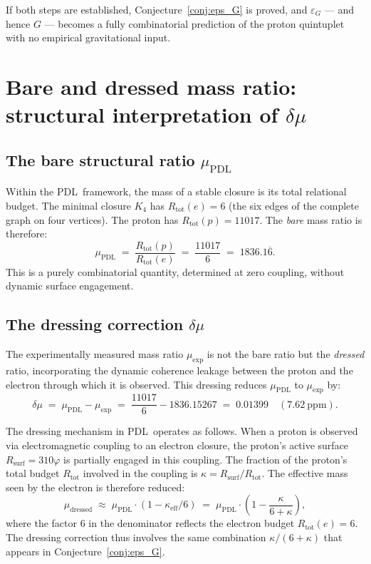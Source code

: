 \documentclass[11pt,a4paper]{article}
\theoremstyle{definition}
\newcommand{\PDL}{\textnormal{PDL}}
\newcommand{\Rsurf}{R_{\mathrm{surf}}}
\newcommand{\Rtot}{R_{\mathrm{tot}}}
\newcommand{\epsg}{\varepsilon_G}
\newcommand{\Kfour}{K_4}
\newcommand{\vp}{\varphi}
\newcommand{\kap}{\kappa}
\newcommand{\muPDL}{\mu_{\mathrm{PDL}}}
\newcommand{\muexp}{\mu_{\mathrm{exp}}}
\begin{document}
If both steps are established, Conjecture~\ref{conj:eps_G} is proved, and $\epsg$ --- and hence $G$ --- becomes a fully combinatorial prediction of the proton quintuplet with no empirical gravitational input.

\section{Bare and dressed mass ratio: structural interpretation of \texorpdfstring{$\delta\mu$}{delta-mu}}
\label{sec:bare_dressed}

\subsection{The bare structural ratio \texorpdfstring{$\muPDL$}{muPDL}}
\label{subsec:bare}

Within the \PDL\ framework, the mass of a stable closure is its total relational budget. The minimal closure $\Kfour$ has $\Rtot(e) = 6$ (the six edges of the complete graph on four vertices). The proton has $\Rtot(p) = 11017$. The \emph{bare} mass ratio is therefore:
\begin{equation}
\label{eq:mu_bare}
\muPDL \;=\; \frac{\Rtot(p)}{\Rtot(e)} \;=\; \frac{11017}{6} \;=\; 1836.1\overline{6}.
\end{equation}
This is a purely combinatorial quantity, determined at zero coupling, without dynamic surface engagement.

\subsection{The dressing correction \texorpdfstring{$\delta\mu$}{delta-mu}}
\label{subsec:dressed}

The experimentally measured mass ratio $\muexp$ is not the bare ratio but the \emph{dressed} ratio, incorporating the dynamic coherence leakage between the proton and the electron through which it is observed. This dressing reduces $\muPDL$ to $\muexp$ by:
\begin{equation}
\label{eq:delta_mu}
\delta\mu \;=\; \muPDL - \muexp \;=\; \frac{11017}{6} - 1836.15267 \;=\; 0.01399 \quad (7.62\ \mathrm{ppm}).
\end{equation}

The dressing mechanism in \PDL\ operates as follows. When a proton is observed via electromagnetic coupling to an electron closure, the proton's active surface $\Rsurf = 310\vp$ is partially engaged in this coupling. The fraction of the proton's total budget $\Rtot$ involved in the coupling is $\kap = \Rsurf/\Rtot$. The effective mass seen by the electron is therefore reduced:
\begin{equation}
\label{eq:dressing_model}
\mu_{\mathrm{dressed}} \;\approx\; \muPDL\cdot(1 - \kap_{\mathrm{eff}}/6) \;=\; \muPDL \cdot \left(1 - \frac{\kap}{6+\kap}\right),
\end{equation}
where the factor $6$ in the denominator reflects the electron budget $\Rtot(e) = 6$. The dressing correction thus involves the same combination $\kap/(6+\kap)$ that appears in Conjecture~\ref{conj:eps_G}.
\end{document}
